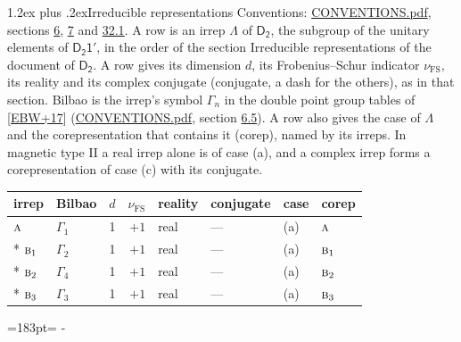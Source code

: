 \documentclass[10pt,a4paper]{article}
\makeatletter
\renewcommand\section{\@startsection{section}{1}{\z@}{-3ex plus -1ex minus -.2ex}%
  {1.2ex plus .2ex}{\normalfont\large\sffamily\bfseries\color{parttitle}}}
\newcommand{\needspace}[1]{\par\penalty-100\begingroup\dimen0=#1\relax\dimen2=\pagegoal
  \advance\dimen2-\pagetotal\ifdim\dimen0>\dimen2\relax\ifdim\dimen2>0pt\vfil\break\fi\fi
  \endgroup}
\numberwithin{equation}{section}
\newcommand{\grp}[1]{\mathsf{#1}}
\newcommand{\irr}[1]{\text{\normalfont\scshape #1}}
\newcommand{\fsind}{\nu_{\mathrm{FS}}}
\makeatother
\begin{document}
\section{Irreducible representations}\label{s:irreps}
Conventions: \href{../../CONVENTIONS.pdf}{CONVENTIONS.pdf}, sections \href{../../../rotation/CONVENTIONS.pdf\#conv.6}{6}, \href{../../../rotation/CONVENTIONS.pdf\#conv.7}{7} and \href{../../CONVENTIONS.pdf\#conv.32.1}{32.1}.
\leavevmode\label{n:irrep.Delta}A row is an irrep $\Lambda$ of $\grp{D_{2}}$, the subgroup of the unitary elements of $\grp{D_{2}1'}$, in the order of the section Irreducible representations of the document of \href{../../../rotation/data/pdf/D2.pdf}{$\grp{D_{2}}$}. \label{n:index.dimension}\label{n:index.frobenius}\label{n:head.irrep}\label{n:head.reality}\label{n:head.conjugate}A row gives its dimension $d$, its Frobenius--Schur indicator $\fsind$, its reality and its complex conjugate (conjugate, a dash for the others), as in that section. \label{n:head.bilbao}\label{n:irrep.alias.gamma}Bilbao is the irrep's symbol $\Gamma_n$ in the double point group tables of [\href{../../../REFERENCES.pdf\#ref.EBW+17}{EBW+17}] (\href{../../CONVENTIONS.pdf}{CONVENTIONS.pdf}, section \href{../../../rotation/CONVENTIONS.pdf\#conv.6.5}{6.5}). \label{n:head.case.corep}\label{n:head.corep}A row also gives the case of $\Lambda$ and the corepresentation that contains it (corep), named by its irreps. In magnetic type II a real irrep alone is of case (a), and a complex irrep forms a corepresentation of case (c) with its conjugate.
\setlength{\emergencystretch}{2em}\par\setlength{\emergencystretch}{0pt}
{\small\renewcommand{\arraystretch}{1.25}\setlength{\tabcolsep}{4pt}\begin{longtable}{@{}llrrllll@{}}\toprule
irrep & Bilbao & $d$ & $\fsind$ & reality & conjugate & case & corep\\\midrule\endhead
\bottomrule\endfoot\endlastfoot
$\irr{a}$ & $\Gamma_{1}$ & 1 & $+1$ & real & --- & (a) & $\irr{a}$\\*
$\irr{b}_{1}$ & $\Gamma_{2}$ & 1 & $+1$ & real & --- & (a) & $\irr{b}_{1}$\\*
$\irr{b}_{2}$ & $\Gamma_{4}$ & 1 & $+1$ & real & --- & (a) & $\irr{b}_{2}$\\*
$\irr{b}_{3}$ & $\Gamma_{3}$ & 1 & $+1$ & real & --- & (a) & $\irr{b}_{3}$\\
\bottomrule\end{longtable}}
\needspace{183pt}
\end{document}
